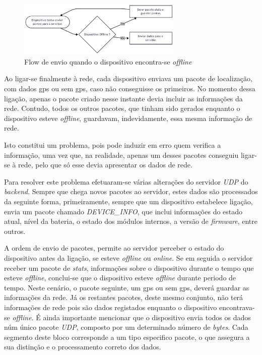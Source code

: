 \begin{figure}[!h]
	\centering
	\includegraphics[width=0.70\textwidth]{figs/flowOffline.png}
	\caption{Flow de envio quando o dispositivo encontra-se \textit{offline}}
	\label{fig:flowOffline}
\end{figure}

Ao ligar-se finalmente à rede, cada dispositivo enviava um pacote de localização, com dados \acs{gps} ou sem \acs{gps}, caso não conseguisse os primeiros. No momento dessa ligação, apenas o pacote criado nesse instante devia incluir as informações da rede. Contudo, todos os outros pacotes, que tinham sido gerados enquanto o dispositivo esteve \textit{offline}, guardavam, indevidamente, essa mesma informação de rede.

Isto constitui um problema, pois pode induzir em erro quem verifica a informação, uma vez que, na realidade, apenas um desses pacotes conseguiu ligar-se à rede, pelo que só esse devia apresentar os dados de rede.

Para resolver este problema efetuaram-se várias alterações do servidor \textit{UDP} do \textit{backend}. Sempre que chega novos pacotes ao servidor, estes dados são processados da seguinte forma, primeiramente, sempre que um dispositivo estabelece ligação, envia um pacote chamado \textit{DEVICE\_INFO}, que inclui informações do estado atual, nível da bateria, o estado dos módulos internos, a versão de \textit{firmware}, entre outros. 

A ordem de envio de pacotes, permite ao servidor perceber o estado do dispositivo antes da ligação, se esteve \textit{offline} ou \textit{online}. Se em seguida o servidor receber um pacote de \textit{stats}, informações sobre o dispositivo durante o tempo que esteve \textit{offline}, conclui-se que o dispositivo esteve \textit{offline} durante periodo de tempo. Neste cenário, o pacote seguinte, um \acs{gps} ou sem \acs{gps}, deverá guardar as informações da rede. Já os restantes pacotes, deste mesmo conjunto, não terá informações de rede pois são dados registados enquanto o dispositivo encontrava-se \textit{offline}. É ainda importante mencionar que o dispositivo envia todos os dados núm único pacote \textit{UDP}, composto por um determinado número de \textit{bytes}. Cada segmento deste bloco corresponde a um tipo especifico pacote, o que assegura a sua distinção e o processamento correto dos dados.